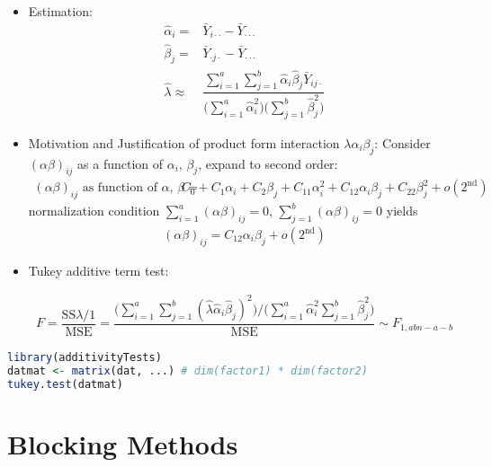 \begin{itemize}[topsep=2pt,itemsep=0pt]
    \item Estimation:
    \begin{align}
        \hat{\alpha }_i=&\bar{Y}_{i\cdot \cdot }-\bar{Y}_{\cdot \cdot \cdot }\\
        \hat{\beta }_j =&\bar{Y}_{\cdot j\cdot }-\bar{Y}_{\cdot \cdot \cdot }\\
        \hat{\lambda }\approx&\dfrac{ \sum_{i=1}^a\sum_{j=1}^b \hat{\alpha }_i\hat{\beta }_j\bar{Y}_{ij\cdot } }{ \big( \sum_{i=1}^a\hat{\alpha }_{i}^2 \big)\big( \sum_{j=1}^b\hat{\beta }_{j}^2 \big) }  
    \end{align}
    \item Motivation and Justification of product form interaction $ \lambda \alpha _i\beta _j $: Consider $ (\alpha \beta )_{ij} $ as a function of $ \alpha _i,\,\beta _j $, expand to second order:
    \begin{align}
        (\alpha \beta )_{ij}\text{ as function of }\alpha ,\,\beta =& C_0+C_1\alpha_i + C_2\beta _j +C_{11}\alpha _i^2+C_{12}\alpha _i\beta _j+C_{22}\beta _j^2+o(2^\mathrm{ nd } )
    \end{align}
    normalization condition $ \sum_{i=1}^a(\alpha \beta ) _{ij}=0 $, $ \sum_{j=1}^b(\alpha \beta )_{ij} =0 $ yields 
    \begin{align}
        (\alpha \beta )_{ij}=C_{12}\alpha _i\beta _j+o(2^\mathrm{ nd }) 
    \end{align}
    \item Tukey additive term test:
    
    \begin{align}
        F=\dfrac{ \mathrm{ SS }\lambda /1  }{ \mathrm{MSE}   } = \dfrac{ \big(\sum_{i=1}^a\sum_{j=1}^b(\hat{\lambda }\hat{\alpha }_i\hat{\beta }_j)^2\big)/\big( \sum_{i=1}^a\hat{\alpha }_i^2\sum_{j=1}^b\hat{\beta }_j^2 \big) }{ \mathrm{ MSE }  }\sim F_{1,abn-a-b}  
    \end{align}
\end{itemize}

\begin{rcode}
\begin{lstlisting}[language=R]
library(additivityTests)
datmat <- matrix(dat, ...) # dim(factor1) * dim(factor2)
tukey.test(datmat)
\end{lstlisting}
\end{rcode}




\section{Blocking Methods}

